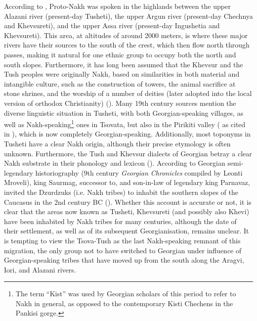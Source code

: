 According to \textcite{nichols11,nichols2004alpine}, Proto-Nakh was spoken in the highlands between the upper Alazani river (present-day Tusheti), the upper Argun river (present-day Chechnya and Khevsureti), and the upper Assa river (present-day Ingushetia and Khevsureti). This area, at altitudes of around 2000 meters, is where these major rivers have their sources to the south of the crest, which then flow north through passes, making it natural for one ethnic group to occupy both the north and south slopes. Furthermore, it has long been assumed that the Khevsur and the Tush peoples were originally Nakh, based on similarities in both material and intangible culture, such as the construction of towers, the animal sacrifice at stone shrines, and the worship of a number of deities (later adopted into the local version of orthodox Christianity) (\cite{klaproth,zisserman,Tsiskarov1846newspaper,guldenstad1}). Many 19th century sources mention the diverse linguistic situation in Tusheti, with both Georgian-speaking villages, as well as Nakh-speaking\footnote{The term “Kist” was used by Georgian scholars of this period to refer to Nakh in general, as opposed to the contemporary Kisti Chechens in the Pankisi gorge.} ones in Tsovata, but also in the Pirikiti valley (\cite{zisserman, eliosidze} as cited in \cite{gigashvili2014migration}), which is now completely Georgian-speaking. Additionally, most toponyms in Tusheti have a clear Nakh origin, although their precise etymology is often unknown. Furthermore, the Tush and Khevsur dialects of Georgian betray a clear Nakh substrate in their phonology and lexicon (\cites[]{uturgaidze1966mountainous}). According to Georgian semi-legendary historiography (9th century \textit{Georgian Chronicles} compiled by Leonti Mroveli), king Saurmag, successor to, and son-in-law of legendary king Parnavaz, invited the Dzurdzuks (i.e. Nakh tribes) to inhabit the southern slopes of the Caucasus in the 2nd century BC (\cites[24]{rayfield2012history}). Whether this account is accurate or not, it is clear that the areas now known as Tusheti, Khevsureti (and possibly also Khevi) have been inhabited by Nakh tribes for many centuries, although the date of their settlement, as well as of its subsequent Georgianisation, remains unclear. It is tempting to view the Tsova-Tush as the last Nakh-speaking remnant of this migration, the only group not to have switched to Georgian under influence of Georgian-speaking tribes that have moved up from the south along the Aragvi, Iori, and Alazani rivers.


